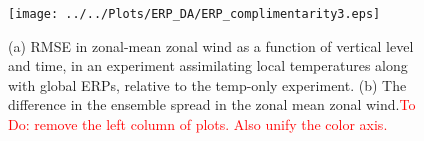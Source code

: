 \documentclass[jgrga]{agutex}
\begin{document}
 \begin{figure}
\texttt{[image: ../../Plots/ERP\_DA/ERP\_complimentarity3.eps]} \\
 \caption{(a) RMSE in zonal-mean zonal wind as a function of vertical level and time, in an experiment assimilating local temperatures along with global ERPs, relative to the temp-only experiment.  (b) The difference in the ensemble spread in the zonal mean zonal wind.\textcolor{red}{To Do: remove the left column of plots.  Also unify the color axis.}}
 \label{fig:added_value}
\end{figure}




%
%
%
%
%

\end{document}
